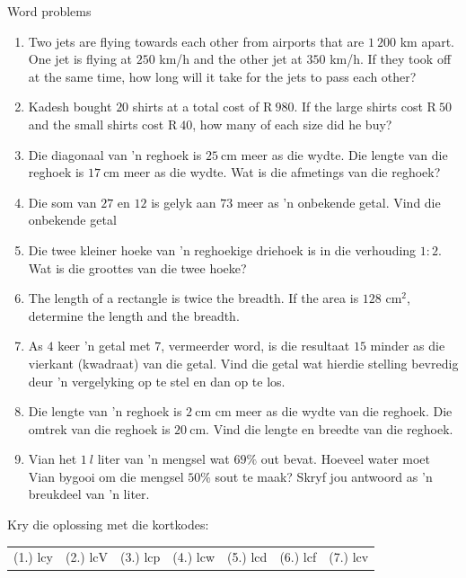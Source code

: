 \begin{exercises}{Word problems}
{
\begin{enumerate}[noitemsep, label=\textbf{\arabic*}. ] 
\item Two jets are flying towards each other from airports that are $1~200$ km apart. One jet is flying at $250$ km/h and the other jet at $350$ km/h. If they took off at the same time, how long will it take for the jets to pass each other?
\item Kadesh bought $20$ shirts at a total cost of R$~980$. If the large shirts cost R$~50$ and the small shirts cost R$~40$, how many of each size did he buy?
\item Die diagonaal van ’n reghoek is $25~$cm meer as die wydte. Die lengte van die reghoek is $17~$cm meer as die wydte. Wat is die afmetings van die reghoek?  
\item Die som van $27$ en $12$ is gelyk aan $73$ meer as ’n onbekende getal. Vind die onbekende getal
\item Die twee kleiner hoeke van ’n reghoekige driehoek is in die verhouding $1:2$. Wat is die groottes van die
twee hoeke?
\item The length of a rectangle is twice the breadth. If the area is $128$ cm$^{2}$, determine the length and the breadth.       
\item As $4$ keer ’n getal met $7$, vermeerder word, is die resultaat $15$ minder as die vierkant (kwadraat) van die
getal. Vind die getal wat hierdie stelling bevredig deur ’n vergelyking op te stel en dan op te los.
\item Die lengte van ’n reghoek is $2~$cm cm meer as die wydte van die reghoek. Die omtrek van die reghoek is  $20~$cm. Vind die lengte en breedte van die reghoek.
\item Vian het $1~l$ liter van ’n mengsel wat $69\%$ out bevat. Hoeveel water moet Vian bygooi om die mengsel $50\%$ sout te maak? Skryf jou antwoord as ’n breukdeel van ’n liter.
       
\end{enumerate}

\par {} Kry die oplossing met die kortkodes:
\par \begin{tabular}[h]{cccccc}
(1.) lcy  &  (2.) lcV  &  (3.) lcp  &  (4.) lcw  &  (5.) lcd  &  (6.) lcf  &  (7.) lcv  & \end{tabular}
}
\end{exercises}


